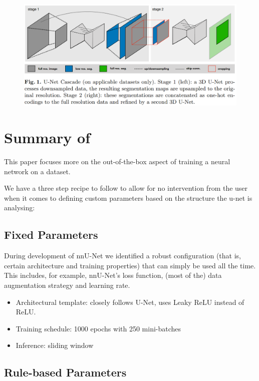 \documentclass[11pt]{article}
\begin{document}
\begin{figure}[H]
    \includegraphics[width=\linewidth]{images/nnunet-diagram.png}
\end{figure}

\section{Summary of~\cite{nnunet-git-paper}}

This paper focuses more on the out-of-the-box aspect of training a neural network on a dataset.

We have a three step recipe to follow to allow for no intervention from the user when it comes to defining custom parameters based on the structure the u-net is analysing:

\subsection{Fixed Parameters}

During development of nnU-Net we identified a robust configuration (that is, certain architecture and training properties) that can simply be used all the time. This includes, for example, nnU-Net's loss function, (most of the) data augmentation strategy and learning rate.

\begin{itemize}
    \item Architectural template: closely follows U-Net, uses Leaky ReLU instead of ReLU.
    \item Training schedule: 1000 epochs with 250 mini-batches
    \item Inference: sliding window
\end{itemize}

\subsection{Rule-based Parameters}
\end{document}
